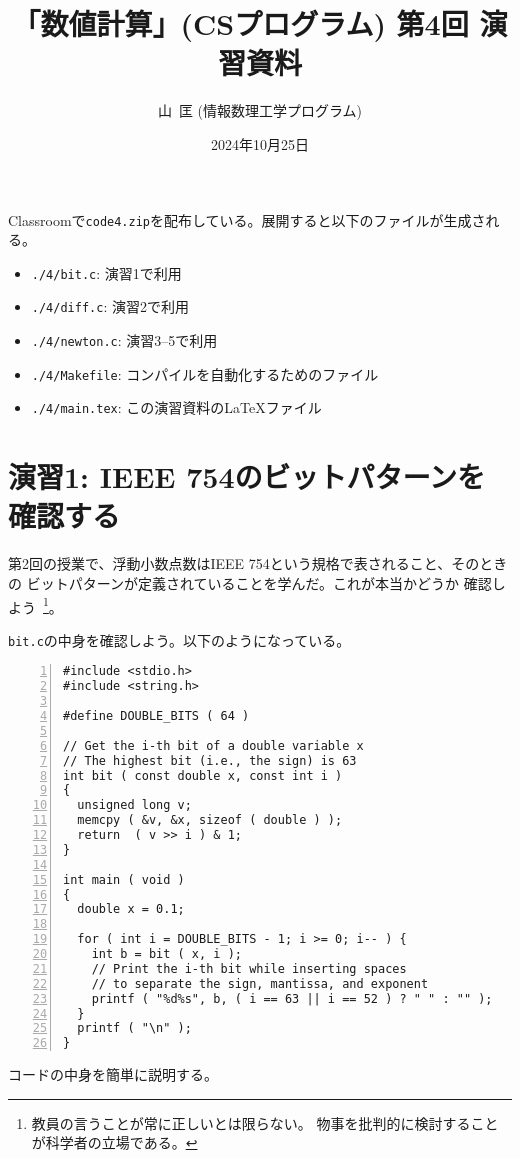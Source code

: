 \documentclass[a4paper]{jsarticle}
\title{「数値計算」(CSプログラム) 第4回 演習資料}
\author{山\zaki\ 匡 (情報数理工学プログラム)}
\date{2024年10月25日}
\begin{document}
\maketitle

Classroomで\texttt{code4.zip}を配布している。展開すると以下のファイルが生成される。
\begin{itemize}
\item \texttt{./4/bit.c}: 演習1で利用
\item \texttt{./4/diff.c}: 演習2で利用
\item \texttt{./4/newton.c}: 演習3--5で利用
\item \texttt{./4/Makefile}: コンパイルを自動化するためのファイル
\item \texttt{./4/main.tex}: この演習資料の\LaTeX ファイル
\end{itemize}
  
\section*{演習1: IEEE 754のビットパターンを確認する}

第2回の授業で、浮動小数点数はIEEE 754という規格で表されること、そのときの
ビットパターンが定義されていることを学んだ。これが本当かどうか
確認しよう~\footnote{教員の言うことが常に正しいとは限らない。
物事を批判的に検討することが科学者の立場である。}。

\texttt{bit.c}の中身を確認しよう。以下のようになっている。
\begin{lstlisting}[caption={\texttt{bit.c}},numbers=left]
#include <stdio.h>
#include <string.h>

#define DOUBLE_BITS ( 64 )

// Get the i-th bit of a double variable x
// The highest bit (i.e., the sign) is 63
int bit ( const double x, const int i )
{
  unsigned long v;
  memcpy ( &v, &x, sizeof ( double ) );
  return  ( v >> i ) & 1;
}

int main ( void )
{
  double x = 0.1;

  for ( int i = DOUBLE_BITS - 1; i >= 0; i-- ) {
    int b = bit ( x, i );
    // Print the i-th bit while inserting spaces
    // to separate the sign, mantissa, and exponent
    printf ( "%d%s", b, ( i == 63 || i == 52 ) ? " " : "" );
  }
  printf ( "\n" );
}
\end{lstlisting}
コードの中身を簡単に説明する。
\end{document}
